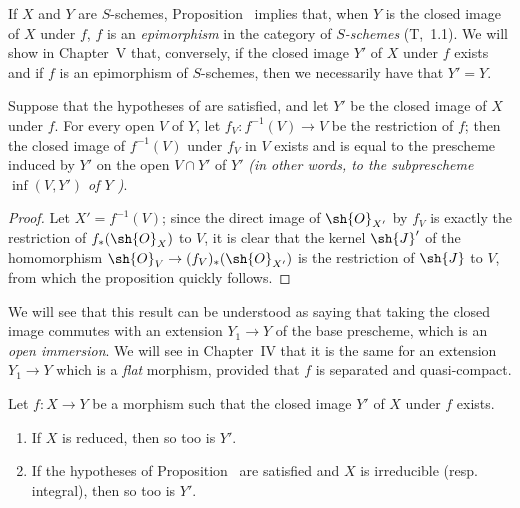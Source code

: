 \begin{remark}[9.5.7]
\label{I.9.5.7}
If $X$ and $Y$ are $S$-schemes, Proposition~ implies that, when
$Y$ is the closed image of $X$ under $f$, $f$ is an \emph{epimorphism} in the category of \emph{$S$-schemes} (T,~1.1).
We will show in Chapter~V that, conversely, if the closed image $Y'$ of $X$ under $f$ exists and if $f$ is an epimorphism of $S$-schemes, then we necessarily have that $Y'=Y$.
\end{remark}

\begin{proposition}[9.5.8]
\label{I.9.5.8}
Suppose that the hypotheses of  are satisfied, and let $Y'$ be the closed image of $X$ under $f$.
For every open $V$ of $Y$, let $f_V:f^{-1}(V)\to V$ be the restriction of $f$; then the closed image of $f^{-1}(V)$ under $f_V$ in $V$ exists and is equal to the prescheme induced by $Y'$ on the open $V\cap Y'$ of $Y'$ \emph{(in other words, to the subprescheme $\inf(V,Y')$ of $Y$ )}.
\end{proposition}

\begin{proof}
Let $X'=f^{-1}(V)$; since the direct image of $\sh{O}_{X'}$ by $f_V$ is exactly the restriction of $f_*(\sh{O}_X)$ to $V$, it is clear that the kernel $\sh{J}'$ of the homomorphism $\sh{O}_V\to(f_V)_*(\sh{O}_{X'})$ is the restriction of $\sh{J}$ to $V$, from which the proposition quickly follows.
\end{proof}

We will see that this result can be understood as saying that taking the closed image commutes with an extension $Y_1\to Y$ of the base prescheme, which is an \emph{open immersion}.
We will see in Chapter~IV that it is the same for an extension $Y_1\to Y$ which is a \emph{flat} morphism, provided that $f$ is separated and quasi-compact.

\begin{proposition}[9.5.9]
\label{I.9.5.9}
Let $f:X\to Y$ be a morphism such that the closed image $Y'$ of $X$ under $f$ exists.
\begin{enumerate}
  \item[{\rm(i)}] If $X$ is reduced, then so too is $Y'$.
  \item[{\rm(ii)}] If the hypotheses of Proposition~ are satisfied and $X$ is irreducible (resp. integral), then so too is $Y'$.
\end{enumerate}
\end{proposition}

